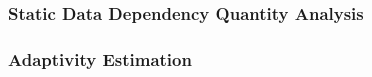 \subsubsection{Static Data Dependency Quantity Analysis}
\label{sec:static-quantity}


\subsubsection{Adaptivity Estimation}
\label{sec:static-adapt}


% 
%
